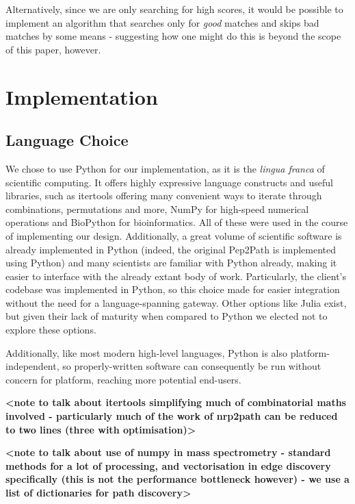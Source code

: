 \documentclass{l4proj}
\newcommand{\cit}[1]{\citep{#1}}
\begin{document}
Alternatively, since we are only searching for high scores, it would be possible to implement an algorithm that searches only for \textit{good} matches and skips bad matches by some means - suggesting how one might do this is beyond the scope of this paper, however. 

\chapter{Implementation}

\section{Language Choice}

We chose to use Python for our implementation, as it is the \textit{lingua franca} of scientific computing. It offers highly expressive language constructs and useful libraries, such as itertools \cit{itools} offering many convenient ways to iterate through combinations, permutations and more, NumPy \cit{numpy} for high-speed numerical operations and BioPython \cit{biopy} for bioinformatics. All of these were used in the course of implementing our design. Additionally, a great volume of scientific software is already implemented in Python (indeed, the original Pep2Path is implemented using Python) and many scientists are familiar with Python already, making it easier to interface with the already extant body of work. Particularly, the client's codebase was implemented in Python, so this choice made for easier integration without the need for a language-spanning gateway. Other options like Julia \cit{julia} exist, but given their lack of maturity when compared to Python we elected not to explore these options. 

Additionally, like most modern high-level languages, Python is also platform-independent, so properly-written software can consequently be run without concern for platform, reaching more potential end-users.

\textbf{<note to talk about itertools simplifying much of combinatorial maths involved - particularly much of the work of nrp2path can be reduced to two lines (three with optimisation)>}

\textbf{<note to talk about use of numpy in mass spectrometry - standard methods for a lot of processing, and vectorisation in edge discovery specifically (this is not the performance bottleneck however) - we use a list of dictionaries for path discovery>}
\end{document}
